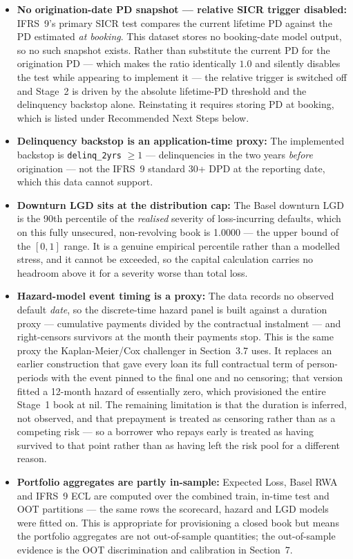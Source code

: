 \documentclass[11pt,a4paper]{article}
\begin{document}
\begin{itemize}
    \item \textbf{No origination-date PD snapshot --- relative SICR trigger disabled:} IFRS~9's primary SICR test compares the current lifetime PD against the PD estimated \emph{at booking}. This dataset stores no booking-date model output, so no such snapshot exists. Rather than substitute the current PD for the origination PD --- which makes the ratio identically $1.0$ and silently disables the test while appearing to implement it --- the relative trigger is switched off and Stage~2 is driven by the absolute lifetime-PD threshold and the delinquency backstop alone. Reinstating it requires storing PD at booking, which is listed under Recommended Next Steps below.
    \item \textbf{Delinquency backstop is an application-time proxy:} The implemented backstop is \texttt{delinq\_2yrs} $\geq 1$ --- delinquencies in the two years \emph{before} origination --- not the IFRS~9 standard 30+ DPD at the reporting date, which this data cannot support.
    \item \textbf{Downturn LGD sits at the distribution cap:} The Basel downturn LGD is the 90th percentile of the \emph{realised} severity of loss-incurring defaults, which on this fully unsecured, non-revolving book is 1.0000 --- the upper bound of the $[0,1]$ range. It is a genuine empirical percentile rather than a modelled stress, and it cannot be exceeded, so the capital calculation carries no headroom above it for a severity worse than total loss.
    \item \textbf{Hazard-model event timing is a proxy:} The data records no observed default \emph{date}, so the discrete-time hazard panel is built against a duration proxy --- cumulative payments divided by the contractual instalment --- and right-censors survivors at the month their payments stop. This is the same proxy the Kaplan-Meier/Cox challenger in Section~3.7 uses. It replaces an earlier construction that gave every loan its full contractual term of person-periods with the event pinned to the final one and no censoring; that version fitted a 12-month hazard of essentially zero, which provisioned the entire Stage~1 book at nil. The remaining limitation is that the duration is inferred, not observed, and that prepayment is treated as censoring rather than as a competing risk --- so a borrower who repays early is treated as having survived to that point rather than as having left the risk pool for a different reason.
    \item \textbf{Portfolio aggregates are partly in-sample:} Expected Loss, Basel RWA and IFRS~9 ECL are computed over the combined train, in-time test and OOT partitions --- the same rows the scorecard, hazard and LGD models were fitted on. This is appropriate for provisioning a closed book but means the portfolio aggregates are not out-of-sample quantities; the out-of-sample evidence is the OOT discrimination and calibration in Section~7.

\end{itemize}
\end{document}
